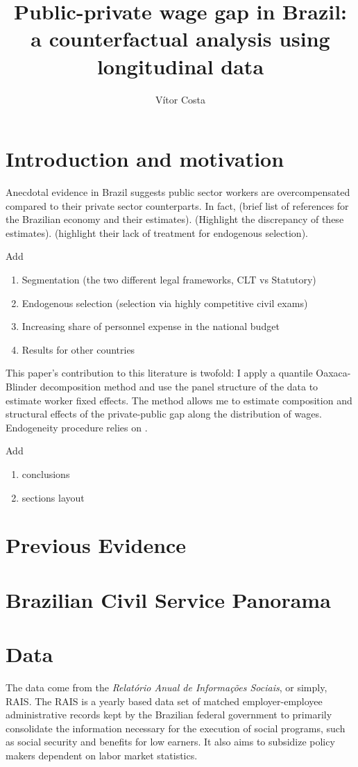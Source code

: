 \documentclass{article}
\title{Public-private wage gap in Brazil: a counterfactual analysis using longitudinal data}
\author{Vítor Costa}
\date
\begin{document}
\maketitle
\tableofcontents

\section{Introduction and motivation}
Anecdotal evidence in Brazil suggests public sector workers are overcompensated compared to their private sector counterparts. In fact, (brief list of references for the Brazilian economy and their estimates). (Highlight the discrepancy of these estimates). (highlight their lack of treatment for endogenous selection).

Add
\begin{enumerate}
    \item Segmentation (the two different legal frameworks, CLT vs Statutory)
    \item Endogenous selection (selection via highly competitive civil exams)
    \item Increasing share of personnel expense in the national budget 
    \item Results for other countries
\end{enumerate}


This paper's contribution to this literature is twofold: I apply a quantile Oaxaca-Blinder decomposition method and use the panel structure of the data to estimate worker fixed effects. The method allows me to estimate composition and structural effects of the private-public gap along the distribution of wages. Endogeneity procedure relies on \cite{canay_simple_2011}.  

Add 
\begin{enumerate}
    \item conclusions
    \item sections layout 
\end{enumerate}

\section{Previous Evidence}\label{section:lit-review}

\section{Brazilian Civil Service Panorama}

\section{Data}
The data come from the \emph{Relatório Anual de Informações Sociais}, or simply, RAIS. The RAIS is a yearly based data set of matched employer-employee administrative records kept by the Brazilian federal government to primarily consolidate the information necessary for the execution of social programs, such as social security and benefits for low earners. It also aims to subsidize policy makers dependent on labor market statistics. \\
\end{document}
